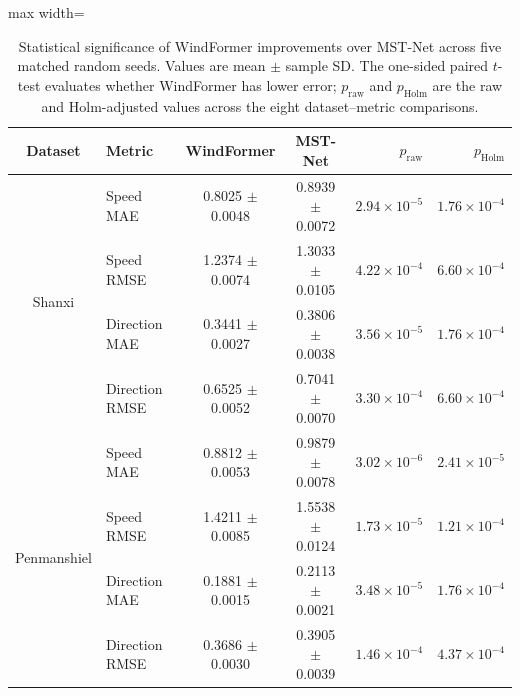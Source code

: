 \begin{table}[htbp]
\centering
\caption{Statistical significance of WindFormer improvements over MST-Net across five matched random seeds. Values are mean $\pm$ sample SD. The one-sided paired $t$-test evaluates whether WindFormer has lower error; $p_{\mathrm{raw}}$ and $p_{\mathrm{Holm}}$ are the raw and Holm-adjusted values across the eight dataset--metric comparisons.}
\label{tab:paired-t-holm}
\scriptsize
\setlength{\tabcolsep}{3.2pt}
\renewcommand{\arraystretch}{1.12}
\begin{adjustbox}{max width=\textwidth}
\begin{tabular}{clccrr}
\toprule
Dataset & Metric & WindFormer & MST-Net & $p_{\mathrm{raw}}$ & $p_{\mathrm{Holm}}$ \\
\midrule
\multirow[c]{4}{*}{Shanxi} & Speed MAE & 0.8025 $\pm$ 0.0048 & 0.8939 $\pm$ 0.0072 & $2.94\times 10^{-5}$ & $1.76\times 10^{-4}$\\
& Speed RMSE & 1.2374 $\pm$ 0.0074 & 1.3033 $\pm$ 0.0105 & $4.22\times 10^{-4}$ & $6.60\times 10^{-4}$\\
& Direction MAE & 0.3441 $\pm$ 0.0027 & 0.3806 $\pm$ 0.0038 & $3.56\times 10^{-5}$ & $1.76\times 10^{-4}$\\
& Direction RMSE & 0.6525 $\pm$ 0.0052 & 0.7041 $\pm$ 0.0070 & $3.30\times 10^{-4}$ & $6.60\times 10^{-4}$\\
\midrule
\multirow[c]{4}{*}{Penmanshiel} & Speed MAE & 0.8812 $\pm$ 0.0053 & 0.9879 $\pm$ 0.0078 & $3.02\times 10^{-6}$ & $2.41\times 10^{-5}$\\
& Speed RMSE & 1.4211 $\pm$ 0.0085 & 1.5538 $\pm$ 0.0124 & $1.73\times 10^{-5}$ & $1.21\times 10^{-4}$\\
& Direction MAE & 0.1881 $\pm$ 0.0015 & 0.2113 $\pm$ 0.0021 & $3.48\times 10^{-5}$ & $1.76\times 10^{-4}$\\
& Direction RMSE & 0.3686 $\pm$ 0.0030 & 0.3905 $\pm$ 0.0039 & $1.46\times 10^{-4}$ & $4.37\times 10^{-4}$\\
\bottomrule
\end{tabular}
\end{adjustbox}
\end{table}

